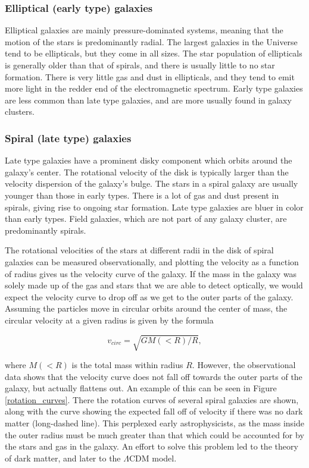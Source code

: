 \subsubsection{Elliptical (early type) galaxies}
Elliptical galaxies are mainly pressure-dominated systems, meaning that the motion of the stars is predominantly radial. The largest galaxies in the Universe tend to be ellipticals, but they come in all sizes. The star population of ellipticals is generally older than that of spirals, and there is usually little to no star formation. There is very little gas and dust in ellipticals, and they tend to emit more light in the redder end of the electromagnetic spectrum. Early type galaxies are less common than late type galaxies, and are more usually found in galaxy clusters.

\subsubsection{Spiral (late type) galaxies} \label{lates}
Late type galaxies have a prominent disky component which orbits around the galaxy's center. The rotational velocity of the disk is typically larger than the velocity dispersion of the galaxy's bulge. The stars in a spiral galaxy are usually younger than those in early types. There is a lot of gas and dust present in spirals, giving rise to ongoing star formation. Late type galaxies are bluer in color than early types. Field galaxies, which are not part of any galaxy cluster, are predominantly spirals. 


The rotational velocities of the stars at different radii in the disk of spiral galaxies can be measured observationally, and plotting the velocity as a function of radius gives us the velocity curve of the galaxy. If the mass in the galaxy was solely made up of the gas and stars that we are able to detect optically, we would expect the velocity curve to drop off as we get to the outer parts of the galaxy. Assuming the particles move in circular orbits around the center of mass, the circular velocity at a given radius is given by the formula

\begin{equation}
    v_{circ} = \sqrt{GM(<R)/R}, 
\end{equation}

where $M(<R)$ is the total mass within radius $R$. However, the observational data shows that the velocity curve does not fall off towards the outer parts of the galaxy, but actually flattens out. An example of this can be seen in Figure \ref{rotation_curves}. There the rotation curves of several spiral galaxies are shown, along with the curve showing the expected fall off of velocity if there was no dark matter (long-dashed line). This perplexed early astrophysicists, as the mass inside the outer radius must be much greater than that which could be accounted for by the stars and gas in the galaxy. An effort to solve this problem led to the theory of dark matter, and later to the $\Lambda$CDM model.

